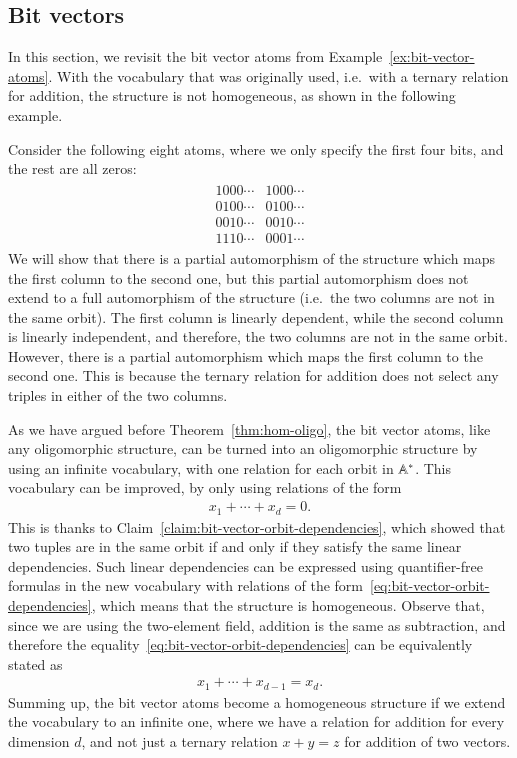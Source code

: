\subsection{Bit vectors}
\label{sec:bit-vectors}
In this section, we revisit the bit vector atoms from Example~\ref{ex:bit-vector-atoms}. With the vocabulary that was originally used, i.e.~with a ternary relation for addition, the structure is not homogeneous, as shown in the following example. 

\begin{myexample}
	Consider the following  eight atoms, where we only specify the first four bits, and the rest are all zeros:
	\begin{align*}
		\begin{array}{ll}
			1000 \cdots & 1000 \cdots \\
			0100 \cdots & 0100 \cdots \\
			0010 \cdots & 0010 \cdots \\
			1110 \cdots & 0001 \cdots
		\end{array}
	\end{align*} 
	We will show that there is a partial automorphism of the structure which maps the first column to the second one, but this partial automorphism does not extend to a full automorphism of the structure (i.e.~the two columns are not in the same orbit).
	The first column is linearly dependent, while the second column is linearly independent, and therefore, the  two columns are not in the same orbit. However, there is a partial automorphism which maps the first column to the second one. This is because the  ternary relation for addition does not select any triples in either of the two columns. 
\end{myexample}

As we have argued before Theorem~\ref{thm:hom-oligo}, the bit vector atoms, like any oligomorphic structure, can be turned into an oligomorphic structure by using an infinite vocabulary, with one relation for each orbit in $\mathbb A^*$. This vocabulary can be improved, by only using relations of the form 
\begin{align}
	\label{eq:bit-vector-orbit-dependencies}
x_1 + \cdots + x_d = 0.
\end{align}
This is thanks to Claim~\ref{claim:bit-vector-orbit-dependencies}, which showed that two tuples are in the same orbit if and only if they satisfy the same linear dependencies. Such linear dependencies can be expressed using quantifier-free formulas in the new vocabulary with relations of the form~\eqref{eq:bit-vector-orbit-dependencies}, which means that the structure is homogeneous. Observe that, since we are using the two-element field, addition is the same as subtraction, and therefore the equality~\eqref{eq:bit-vector-orbit-dependencies} can be equivalently stated as 
\begin{align*}
x_1 + \cdots + x_{d-1} = x_d.
\end{align*}
Summing up, the bit vector atoms become a homogeneous structure if we extend the vocabulary to an infinite one, where we have a relation for addition for every dimension $d$, and not just a ternary relation $x+y =z$ for addition of two vectors. 



